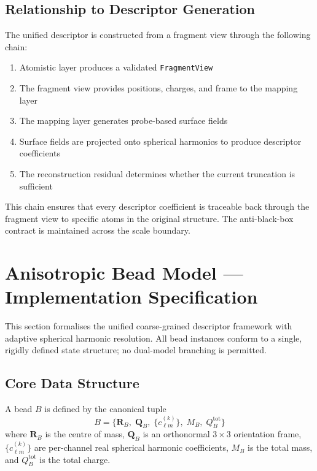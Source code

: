 \documentclass[11pt]{article}
\begin{document}
\subsection{Relationship to Descriptor Generation}

The unified descriptor is constructed from a fragment view through the following chain:

\begin{enumerate}
    \item Atomistic layer produces a validated \texttt{FragmentView}
    \item The fragment view provides positions, charges, and frame to the mapping layer
    \item The mapping layer generates probe-based surface fields
    \item Surface fields are projected onto spherical harmonics to produce descriptor coefficients
    \item The reconstruction residual determines whether the current truncation is sufficient
\end{enumerate}

This chain ensures that every descriptor coefficient is traceable back through the fragment view to specific atoms in the original structure. The anti-black-box contract is maintained across the scale boundary.

\section{Anisotropic Bead Model --- Implementation Specification}

This section formalises the unified coarse-grained descriptor framework with
adaptive spherical harmonic resolution.  All bead instances conform to a single,
rigidly defined state structure; no dual-model branching is permitted.

\subsection{Core Data Structure}

A bead $B$ is defined by the canonical tuple
\begin{equation}
    B = \bigl\{ \mathbf{R}_B,\; \mathbf{Q}_B,\; \{c_{\ell m}^{(k)}\},\; M_B,\; Q_B^{\mathrm{tot}} \bigr\}
\end{equation}
where $\mathbf{R}_B$ is the centre of mass, $\mathbf{Q}_B$ is an orthonormal
$3\times3$ orientation frame, $\{c_{\ell m}^{(k)}\}$ are per-channel real
spherical harmonic coefficients, $M_B$ is the total mass, and
$Q_B^{\mathrm{tot}}$ is the total charge.
\end{document}
